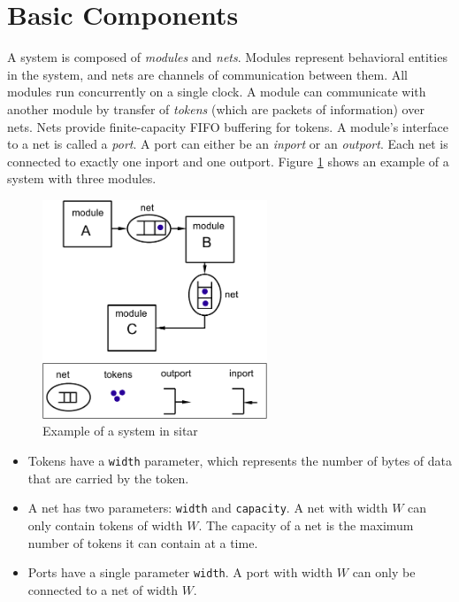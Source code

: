 \documentclass[12pt,a4paper]{article}
\begin{document}
\section{Basic Components} \label{sec:Components}
A system is composed of {\em modules} and {\em nets}.
Modules represent behavioral entities in the system,
and nets are channels of communication between them.
All modules run concurrently on a single clock.
A module can communicate with another module
by transfer of {\em tokens} (which are packets of
information) over nets.
Nets provide finite-capacity
FIFO buffering for tokens.
%
A module's interface to a net is called 
a {\em port}. A port can either be an {\em inport} or an {\em outport}.
Each net is connected to exactly one inport and one outport.
Figure \ref{fig:ExecutionModel} shows an example of a system 
with three modules.
%
\begin{figure}[h]
\centering
\includegraphics[width=0.6\textwidth]{ExecutionModel.pdf}
\caption{Example of a system in sitar}
\label{fig:ExecutionModel}
\end{figure}

\begin{itemize}
\item Tokens have a {\tt width} parameter, which represents the
number of bytes of data that are carried by the token.

\item A net has two parameters:
{\tt width} and {\tt capacity}. A net with width $W$ can only 
contain tokens of width $W$. The capacity of a net is the maximum number
of tokens it can contain at a time.

\item Ports have a single parameter {\tt width}. A port with width $W$ can only be 
connected to a net of width $W$.
\end{itemize}
\end{document}
